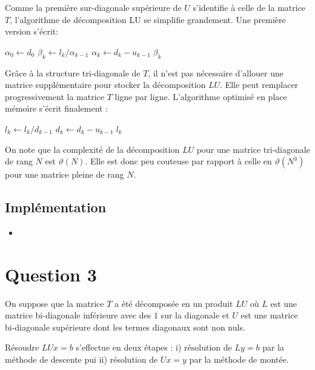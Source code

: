 \documentclass{article}
\newcommand{\cscript}[2]
  {\begin{itemize}\item[]\end{itemize}}
\begin{document}
Comme la première sur-diagonale supérieure de $U$ s'identifie à celle de la matrice $T$,
 l'algorithme de décomposition LU se simplifie grandement.
 Une première version s'écrit:\\

\begin{algorithmic}[1]
\State $\alpha_0 \gets d_0$
	\State $\beta_k \gets l_k/\alpha_{k-1}$
	\State $\alpha_k \gets d_k -u_{k-1} \; \beta_k$
\EndFor                 
\EndFunction
\end{algorithmic}

Grâce à la structure tri-diagonale de $T$, il n'est pas nécessaire d'allouer une matrice supplémentaire
pour stocker la décomposition $LU$. Elle peut remplacer progressivement la matrice $T$ ligne par ligne.
L'algorithme optimisé en place mémoire s'écrit finalement : \\

\begin{algorithmic}[1]
 
	\State $l_k \gets l_k/d_{k-1}$
	\State $d_k \gets d_k -u_{k-1} \; l_k$
\EndFor                 
\EndFunction
\end{algorithmic}

On note que la complexité de la décomposition $LU$ pour une matrice tri-diagonale de rang $N$ est $\vartheta(N)$.
Elle est donc peu couteuse par rapport à celle en $\vartheta(N^3)$ pour une matrice pleine de rang $N$.

\subsection{Implémentation}

\cscript{invM}{Construction de la décomposition $LU$}

\section{Question 3}

On suppose que la matrice $T$ a été décomposée en un produit $LU$ où $L$ est une matrice bi-diagonale inférieure
avec des $1$ sur la diagonale et $U$ est une matrice bi-diagonale supérieure dont les termes diagonaux sont non nuls.

Résoudre $LU x=b$ s'effectue en deux étapes : i) résolution de $L y=b$ par la méthode de descente pui ii) résolution
de $U x=y$ par la méthode de montée.
\end{document}
